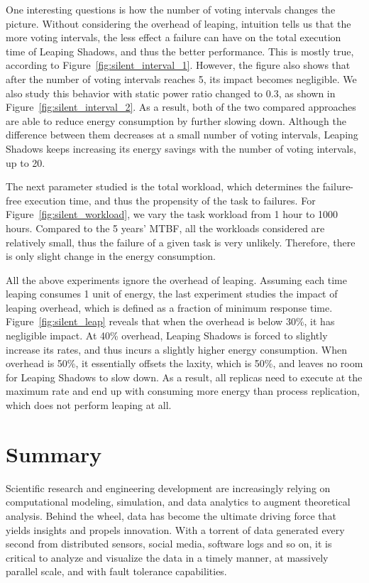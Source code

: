 One interesting questions is how the number of voting intervals changes the picture. Without considering the overhead of leaping, intuition tells us that the more voting intervals, the less effect a failure can have on the total execution time of Leaping Shadows, and thus the better performance. This is mostly true, according to Figure~\ref{fig:silent_interval_1}. However, the figure also shows that after the number of voting intervals reaches 5, its impact becomes negligible. We also study this behavior with static power ratio changed to 0.3, as shown in Figure~\ref{fig:silent_interval_2}. 
As a result, both of the two compared approaches are able to reduce energy consumption by further slowing down. 
Although the difference between them decreases at a small number of voting intervals, Leaping Shadows keeps increasing its energy savings with the number of voting intervals, up to 20.

The next parameter studied is the total workload, which determines the failure-free execution time, and thus the propensity of the task to failures. For Figure~\ref{fig:silent_workload}, we vary the task workload from 1 hour to 1000 hours. Compared to the 5 years' MTBF, all the workloads considered are relatively small, thus the failure of a given task is very unlikely. Therefore, there is only slight change in the energy consumption. 

All the above experiments ignore the overhead of leaping. Assuming each time leaping consumes 1 unit of energy, the last experiment studies the impact of leaping overhead, which is defined as a fraction of minimum response time. Figure~\ref{fig:silent_leap} reveals that when the overhead is below 30\%, it has negligible impact. At 40\% overhead, Leaping Shadows is forced to slightly increase its rates, and thus incurs a slightly higher energy consumption. When overhead is 50\%, it essentially offsets the laxity, which is 50\%, and leaves no room for Leaping Shadows to slow down. As a result, all replicas need to execute at the maximum rate and end up with consuming more energy than process replication, which does not perform leaping at all.

\section{Summary}
Scientific research and engineering development are increasingly relying on computational modeling, simulation, and data analytics to augment theoretical analysis. Behind the wheel, data has become the ultimate driving force that yields insights and propels innovation. With a torrent of data generated every second from distributed sensors, social media, software logs and so on, it is critical to analyze and visualize the data in a timely manner,  at massively parallel scale, and with fault tolerance capabilities. 

